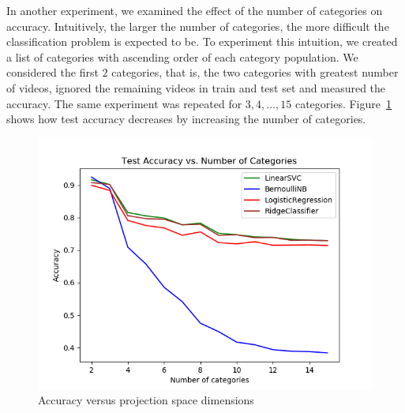 In another experiment, we examined the effect of the number of categories on accuracy. Intuitively, the larger the number of categories, the more difficult the classification problem is expected to be. To experiment this intuition, we created a list of categories with ascending order of each category population. We considered the first $2$ categories, that is, the two categories with greatest number of videos, ignored the remaining videos in train and test set and measured the accuracy. The same experiment was repeated for $3, 4, \ldots, 15$ categories.
Figure~\ref{fig:cat-num-test} shows how test accuracy decreases by increasing the number of categories.
\begin{figure}%
\includegraphics[width=1.0\columnwidth]{figures/cat-num-test-acc.png}%
\caption{Accuracy versus projection space dimensions}%
\label{fig:cat-num-test}%
\end{figure}